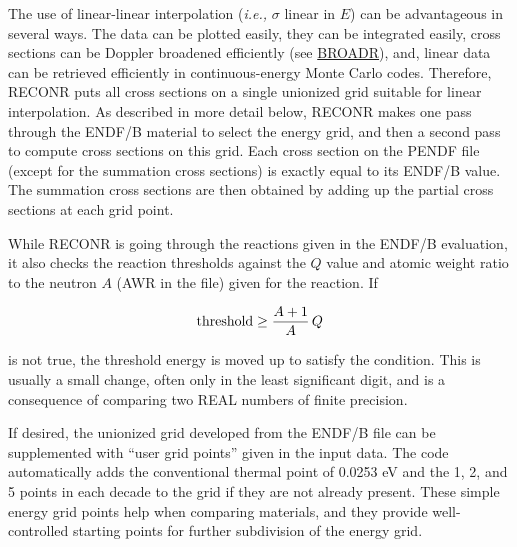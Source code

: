 The use of linear-linear interpolation ({\it i.e.,} $\sigma$ linear
in $E$) can be advantageous in several
ways.  The data can be plotted easily, they can be integrated easily,
cross sections can be Doppler broadened
efficiently (see \hyperlink{sBROADRhy}{BROADR}), and,
linear data can be retrieved efficiently in continuous-energy
Monte Carlo codes. 
Therefore, RECONR puts all cross sections on a single unionized
grid suitable for linear interpolation.  As described in more
detail below, RECONR makes one pass through the ENDF/B material
to select the energy grid, and then a second pass to compute
cross sections on this grid.  Each cross section on the
PENDF file (except for the summation cross
sections) is exactly equal
to its ENDF/B value.  The summation cross sections are then
obtained by adding up the partial cross sections at each
grid point.

While RECONR is going through the reactions given in the ENDF/B
evaluation, it also checks the reaction thresholds
against the $Q$ value and atomic weight
ratio to the neutron $A$ (AWR
in the file) given for the reaction.  If

\begin{equation}
   {\rm threshold} \ge \frac{A+1}{A}\,Q
\end{equation}

\noindent
is not true, the threshold energy is moved up to satisfy
the condition.  This is usually a small change, often only
in the least significant digit, and is a consequence of
comparing two REAL numbers of finite precision.

If desired, the unionized grid developed from the ENDF/B file can
be supplemented with ``user grid points'' given
in the input data.  The code automatically adds the conventional
thermal point of 0.0253 eV and the 1, 2, and 5 points in each
decade to the grid if they are not already present.  These simple
energy grid points help when comparing materials, and they provide
well-controlled starting points for further subdivision of
the energy grid.

